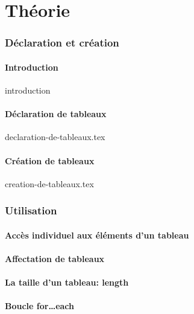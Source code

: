 \documentclass[utf8]{beamer}
\begin{document}
    \part{Théorie}

    \section{Déclaration et création}\label{sec:declaration-et-creation}
        \subsection{Introduction}\label{subsec:introduction}
    {introduction}
        \subsection{Déclaration de tableaux}\label{subsec:declaration-de-tableaux}
    {declaration-de-tableaux.tex}
        \subsection{Création de tableaux}\label{subsec:creation-de-tableaux}
    {creation-de-tableaux.tex}

    \section{Utilisation}
        \subsection{Accès individuel aux éléments d'un tableau}\label{subsec:acces-individuel-aux-elements-dun-tableau}
        \subsection{Affectation de tableaux}\label{subsec:affectation-de-tableaux}
        \subsection{La taille d'un tableau: length}\label{subsec:la-taille-dun-tableau}
        \subsection{Boucle for\ldots each}\label{subsec:boucle-foreach}
\end{document}

